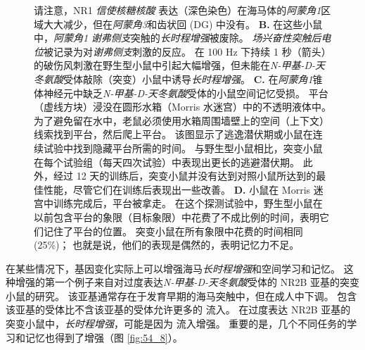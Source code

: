 \begin{figure}[htbp]
{		请注意，NR1 \textit{信使核糖核酸} 表达（深色染色）在海马体的\textit{阿蒙角1}区域大大减少，但在\textit{阿蒙角3}和齿状回 (DG) 中没有。
		\textbf{B.} 在这些小鼠中，\textit{阿蒙角1} \textit{谢弗侧支}突触的\textit{长时程增强}被废除。
		\textit{场兴奋性突触后电位}被记录为对\textit{谢弗侧支}刺激的反应。
		在 100 Hz 下持续 1 秒（箭头）的破伤风刺激在野生型小鼠中引起大幅增强，但未能在\textit{N-甲基-D-天冬氨酸}受体敲除（突变）小鼠中诱导\textit{长时程增强}。
		\textbf{C.} 在\textit{阿蒙角1}锥体神经元中缺乏\textit{N-甲基-D-天冬氨酸}受体的小鼠空间记忆受损。
		平台（虚线方块）浸没在圆形水箱（Morris 水迷宫）中的不透明液体中。 为了避免留在水中，老鼠必须使用水箱周围墙壁上的空间（上下文）线索找到平台，然后爬上平台。
		该图显示了逃逸潜伏期或小鼠在连续试验中找到隐藏平台所需的时间。
		与野生型小鼠相比，突变小鼠在每个试验组（每天四次试验）中表现出更长的逃避潜伏期。
		此外，经过 12 天的训练后，突变小鼠并没有达到对照小鼠所达到的最佳性能，尽管它们在训练后表现出一些改善。
		\textbf{D.} 小鼠在 Morris 迷宫中训练完成后，平台被拿走。
		在这个探测试验中，野生型小鼠在以前包含平台的象限（目标象限）中花费了不成比例的时间，表明它们记住了平台的位置。
		突变小鼠在所有象限中花费的时间相同 (25\%)； 也就是说，他们的表现是偶然的，表明记忆力不足。}
	\label{fig:54_7}
\end{figure}


在某些情况下，基因变化实际上可以增强海马\textit{长时程增强}和空间学习和记忆。
这种增强的第一个例子来自对过度表达\textit{N-甲基-D-天冬氨酸}受体的 NR2B 亚基的突变小鼠的研究。
该亚基通常存在于发育早期的海马突触中，但在成人中下调。
包含该亚基的受体比不含该亚基的受体允许更多的  流入。
在过度表达 NR2B 亚基的突变小鼠中，\textit{长时程增强}，可能是因为  流入增强。
重要的是，几个不同任务的学习和记忆也得到了增强（图 \ref{fig:54_8}）。


